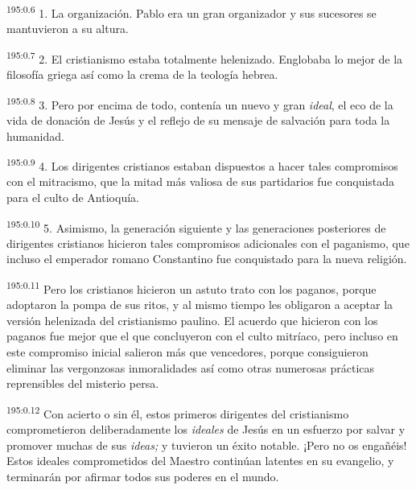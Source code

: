 \par
\textsuperscript{195:0.6} 1. La organización. Pablo era un gran organizador y sus sucesores se mantuvieron a su altura.

\par
\textsuperscript{195:0.7} 2. El cristianismo estaba totalmente helenizado. Englobaba lo mejor de la filosofía griega así como la crema de la teología hebrea.

\par
\textsuperscript{195:0.8} 3. Pero por encima de todo, contenía un nuevo y gran \textit{ideal}, el eco de la vida de donación de Jesús y el reflejo de su mensaje de salvación para toda la humanidad.

\par
\textsuperscript{195:0.9} 4. Los dirigentes cristianos estaban dispuestos a hacer tales compromisos con el mitracismo, que la mitad más valiosa de sus partidarios fue conquistada para el culto de Antioquía.

\par
\textsuperscript{195:0.10} 5. Asimismo, la generación siguiente y las generaciones posteriores de dirigentes cristianos hicieron tales compromisos adicionales con el paganismo, que incluso el emperador romano Constantino fue conquistado para la nueva religión.

\par
\textsuperscript{195:0.11} Pero los cristianos hicieron un astuto trato con los paganos, porque adoptaron la pompa de sus ritos, y al mismo tiempo les obligaron a aceptar la versión helenizada del cristianismo paulino. El acuerdo que hicieron con los paganos fue mejor que el que concluyeron con el culto mitríaco, pero incluso en este compromiso inicial salieron más que vencedores, porque consiguieron eliminar las vergonzosas inmoralidades así como otras numerosas prácticas reprensibles del misterio persa.

\par
\textsuperscript{195:0.12} Con acierto o sin él, estos primeros dirigentes del cristianismo comprometieron deliberadamente los \textit{ideales} de Jesús en un esfuerzo por salvar y promover muchas de sus \textit{ideas;} y tuvieron un éxito notable. ¡Pero no os engañéis! Estos ideales comprometidos del Maestro continúan latentes en su evangelio, y terminarán por afirmar todos sus poderes en el mundo.

